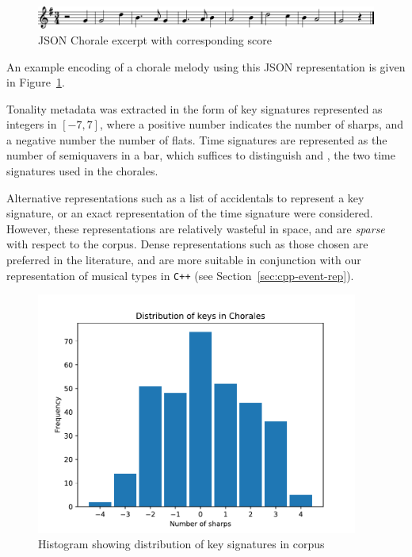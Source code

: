 \documentclass[12pt,a4paper,twoside,openright]{report}
\begin{document}
\begin{figure}[H]
\centering
\includegraphics[width=450pt]{figs/aus_meines_excerpt.pdf}
\caption{JSON Chorale excerpt with corresponding score}
\label{fig:chorale-excerpt}
\end{figure}

An example encoding of a chorale melody using this JSON representation is given
in Figure~\ref{fig:chorale-excerpt}. 

Tonality metadata was extracted in the form of key signatures represented as
integers in $[-7,7]$, where a positive number indicates the number of sharps,
and a negative number the number of flats.  Time signatures are represented as
the number of semiquavers in a bar, which suffices to distinguish
 and , the two time signatures
used in the chorales.

Alternative representations such as a list of accidentals to represent a key
signature, or an exact representation of the time signature were considered.
However, these representations are relatively wasteful in space, and are
\emph{sparse} with respect to the corpus. Dense representations such as those
chosen are preferred in the literature, and are more suitable in conjunction
with our representation of musical types in \texttt{C++} (see
Section~\ref{sec:cpp-event-rep}).

\begin{figure}[H]
\centering
\includegraphics[width=300pt]{figs/key_dist.pdf}
\caption{Histogram showing distribution of key signatures in corpus}
\label{fig:key-dist}
\end{figure}
\end{document}
